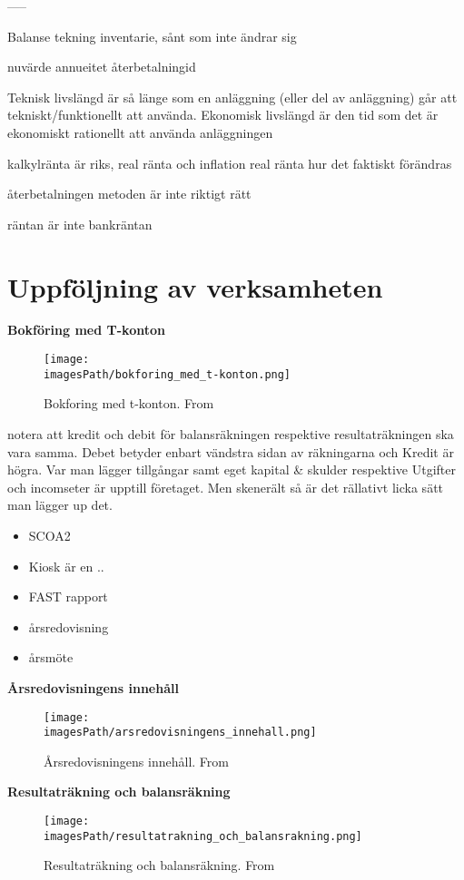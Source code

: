-----

Balanse tekning
inventarie, sånt som inte ändrar sig

nuvärde
annueitet
återbetalningid

Teknisk livslängd är så länge som en anläggning (eller del av anläggning) går att tekniskt/funktionellt att använda. Ekonomisk livslängd är den tid som det är ekonomiskt rationellt att använda anläggningen


kalkylränta är riks, real ränta och inflation
real ränta hur det faktiskt förändras

återbetalningen metoden är inte riktigt rätt

räntan är inte bankräntan

\section{Uppföljning av verksamheten}

\textbf{Bokföring med T-konton}
\begin{figure}[H]
    \centering
    \texttt{[image: \\imagesPath/bokforing\_med\_t-konton.png]}
    \caption{Bokforing med t-konton. From \cite{im}}
\end{figure}
notera att kredit och debit för balansräkningen respektive resultaträkningen ska vara samma.
Debet betyder enbart vändstra sidan av räkningarna och Kredit är högra.
Var man lägger tillgångar samt eget kapital \& skulder respektive Utgifter och incomseter är 
upptill företaget. Men skenerält så är det rällativt licka sätt man lägger up det.

\begin{itemize}
    \item SCOA2
    \item Kiosk är en ..
    \item FAST rapport
    \item årsredovisning
    \item årsmöte
\end{itemize}

\textbf{Årsredovisningens innehåll}
\begin{figure}[H]
    \centering
    \texttt{[image: \\imagesPath/arsredovisningens\_innehall.png]}
    \caption{Årsredovisningens innehåll. From \cite{im}}
\end{figure}

\textbf{Resultaträkning och balansräkning}
\begin{figure}[H]
    \centering
    \texttt{[image: \\imagesPath/resultatrakning\_och\_balansrakning.png]}
    \caption{Resultaträkning och balansräkning. From \cite{im}}
\end{figure}

